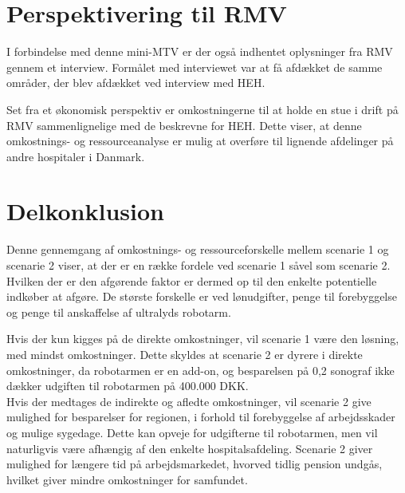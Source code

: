 \section{Perspektivering til RMV}
I forbindelse med denne mini-MTV er der også indhentet oplysninger fra RMV gennem et interview. Formålet med interviewet var at få afdækket de samme områder, der blev afdækket ved interview med HEH. 

Set fra et økonomisk perspektiv er omkostningerne til at holde en stue i drift på RMV sammenlignelige med de beskrevne for HEH. Dette viser, at denne omkostnings- og ressourceanalyse er mulig at overføre til lignende afdelinger på andre hospitaler i Danmark. 

\section{Delkonklusion}
Denne gennemgang af omkostnings- og ressourceforskelle mellem scenarie 1 og scenarie 2 viser, at der er en række fordele ved scenarie 1 såvel som scenarie 2. Hvilken der er den afgørende faktor er dermed op til den enkelte potentielle indkøber at afgøre. De største forskelle er ved lønudgifter, penge til forebyggelse og penge til anskaffelse af ultralyds robotarm. 

Hvis der kun kigges på de direkte omkostninger, vil scenarie 1 være den løsning, med mindst omkostninger. Dette skyldes at scenarie 2 er dyrere i direkte omkostninger, da robotarmen er en add-on, og besparelsen på 0,2 sonograf ikke dækker udgiften til robotarmen på 400.000 DKK. \\
Hvis der medtages de indirekte og afledte omkostninger, vil scenarie 2 give mulighed for besparelser for regionen, i forhold til forebyggelse af arbejdsskader og mulige sygedage. Dette kan opveje for udgifterne til robotarmen, men vil naturligvis være afhængig af den enkelte hospitalsafdeling. Scenarie 2 giver mulighed for længere tid på arbejdsmarkedet, hvorved tidlig pension undgås, hvilket giver mindre omkostninger for samfundet.

